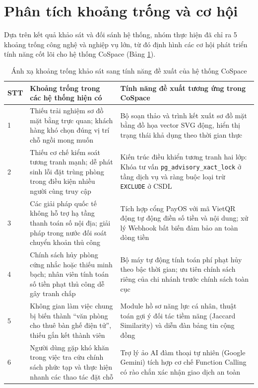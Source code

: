 \section{Phân tích khoảng trống và cơ hội}
\label{sec:gap}

Dựa trên kết quả khảo sát và đối sánh hệ thống, nhóm thực hiện đã chỉ ra 5 khoảng trống công nghệ và nghiệp vụ lớn, từ đó định hình các cơ hội phát triển tính năng cốt lõi cho hệ thống CoSpace (Bảng \ref{tab:gap_tinhnang}).

\begin{table}[H]
\centering
\caption{Ánh xạ khoảng trống khảo sát sang tính năng đề xuất của hệ thống CoSpace}
\label{tab:gap_tinhnang}
\small
\renewcommand{\arraystretch}{1.25}
\begin{tabular}{|p{0.8cm}|p{6.0cm}|p{7.4cm}|}
\hline
\textbf{STT} & \textbf{Khoảng trống trong các hệ thống hiện có} & \textbf{Tính năng đề xuất tương ứng trong CoSpace} \\
\hline
1 & Thiếu trải nghiệm sơ đồ mặt bằng trực quan; khách hàng khó chọn đúng vị trí chỗ ngồi mong muốn & Bộ soạn thảo và trình kết xuất sơ đồ mặt bằng đồ họa vector SVG động, hiển thị trạng thái khả dụng theo thời gian thực \\
\hline
2 & Thiếu cơ chế kiểm soát tương tranh mạnh; dễ phát sinh lỗi đặt trùng phòng trong điều kiện nhiều người cùng truy cập & Kiến trúc điều khiển tương tranh hai lớp: Khóa tư vấn \texttt{pg\_advisory\_xact\_lock} ở tầng dịch vụ và ràng buộc loại trừ \texttt{EXCLUDE} ở CSDL \\
\hline
3 & Các giải pháp quốc tế không hỗ trợ hạ tầng thanh toán số nội địa; giải pháp trong nước đối soát chuyển khoản thủ công & Tích hợp cổng PayOS với mã VietQR động tự động điền số tiền và nội dung; xử lý Webhook bất biến đảm bảo an toàn dòng tiền \\
\hline
4 & Chính sách hủy phòng cứng nhắc hoặc thiếu minh bạch; nhân viên tính toán số tiền phạt thủ công dễ gây tranh chấp & Bộ máy tự động tính toán phí phạt hủy theo bậc thời gian; ưu tiên chính sách riêng của chi nhánh trước chính sách toàn cục \\
\hline
5 & Không gian làm việc chung bị biến thành ``văn phòng cho thuê bàn ghế điện tử'', thiếu gắn kết thành viên & Module hồ sơ năng lực cá nhân, thuật toán gợi ý đối tác tiềm năng (Jaccard Similarity) và diễn đàn bảng tin cộng đồng \\
\hline
6 & Người dùng gặp khó khăn trong việc tra cứu chính sách phức tạp và thực hiện nhanh các thao tác đặt chỗ & Trợ lý ảo AI đàm thoại tự nhiên (Google Gemini) tích hợp cơ chế Function Calling có rào chắn xác nhận giao dịch an toàn \\
\hline
\end{tabular}
\end{table}

